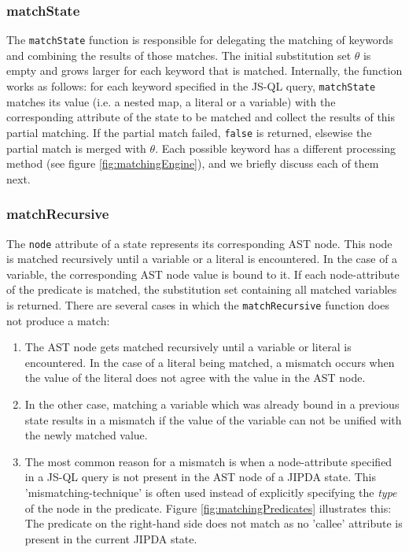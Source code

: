 \subsubsection{matchState}
The \texttt{matchState} function is responsible for delegating the matching of keywords and combining the results of those matches. The initial substitution set $\theta$ is empty and grows larger for each keyword that is matched. Internally, the function works as follows: for each keyword specified in the JS-QL query, \texttt{matchState} matches its value (i.e. a nested map, a literal or a variable) with the corresponding attribute of the state to be matched and collect the results of this partial matching. If the partial match failed, \texttt{false} is returned, elsewise the partial match is merged with $\theta$. Each possible keyword has a different processing method (see figure \ref{fig:matchingEngine}), and we briefly discuss each of them next.

\subsubsection{matchRecursive}
The \texttt{node} attribute of a state represents its corresponding AST node. This node is matched recursively until a variable or a literal is encountered. In the case of a variable, the corresponding AST node value is bound to it. If each node-attribute of the predicate is matched, the substitution set containing all matched variables is returned. There are several cases in which the \texttt{matchRecursive} function does not produce a match:
\begin{enumerate}
\item The AST node gets matched recursively until a variable or literal is encountered. In the case of a literal being matched, a mismatch occurs when the value of the literal does not agree with the value in the AST node.
\item In the other case, matching a variable which was already bound in a previous state results in a mismatch if the value of the variable can not be unified with the newly matched value.
\item The most common reason for a mismatch is when a node-attribute specified in a JS-QL query is not present in the AST node of a JIPDA state. This 'mismatching-technique' is often used instead of explicitly specifying the \textit{type} of the node in the predicate. Figure \ref{fig:matchingPredicates} illustrates this: The predicate on the right-hand side does not match as no 'callee' attribute is present in the current JIPDA state.
\end{enumerate}


